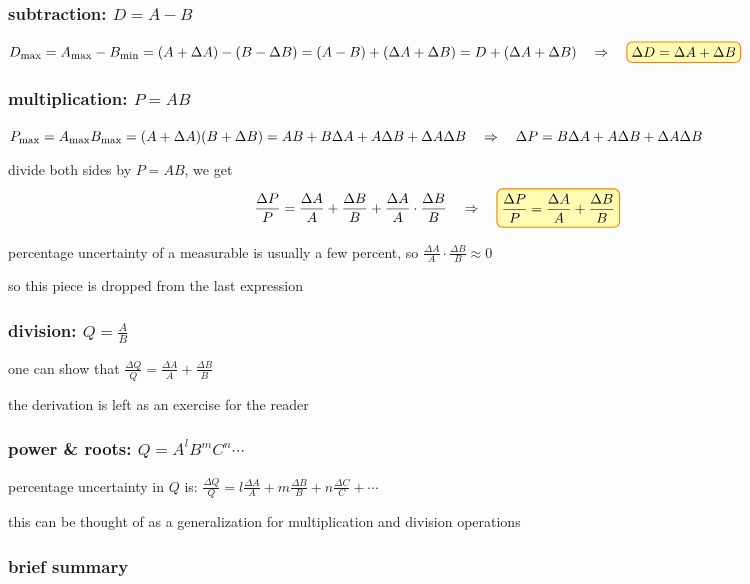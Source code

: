 \subsubsection*{subtraction: $D=A-B$}

$D_\tmax = A_\tmax - B_\tmin = (A + \Delta A) - (B - \Delta B) = (A-B) + (\Delta A + \Delta B)= D + (\Delta A + \Delta B) \RA \boxed{\Delta D = \Delta A + \Delta B}$

\subsubsection*{multiplication: $P=AB$}

$P_{\text{max}} = A_{\text{max}} B_{\text{max}} = (A + \Delta A)(B + \Delta B) = AB + B\Delta A + A\Delta B + \Delta A \Delta B \quad \Rightarrow \quad \Delta P =  B\Delta A + A\Delta B + \Delta A \Delta B$

divide both sides by $P=AB$, we get
\begin{equation*}
\frac{\Delta P}{P} = \frac{\Delta A}{A} + \frac{\Delta B}{B} + \frac{\Delta A}{A}\cdot\frac{\Delta B}{B} \RA \boxed{\frac{\Delta P}{P} = \frac{\Delta A}{A} + \frac{\Delta B}{B}}
\end{equation*}

percentage uncertainty of a measurable is usually a few percent, so $\frac{\Delta A}{A}\cdot\frac{\Delta B}{B} \approx 0$

so this piece is dropped from the last expression

\subsubsection*{division: $Q=\frac{A}{B}$}

one can show that $\boxed{\frac{\Delta Q}{Q} = \frac{\Delta A}{A} + \frac{\Delta B}{B}}$

the derivation is left as an exercise for the reader

\subsubsection*{power \& roots: $Q=A^l B^m C^n\cdots$}

percentage uncertainty in $Q$ is: $\frac{\Delta Q}{Q} = l\frac{\Delta A}{A} + m\frac{\Delta B}{B} + n\frac{\Delta C}{C} +\cdots$

this can be thought of as a generalization for multiplication and division operations


\subsubsection*{brief summary}

